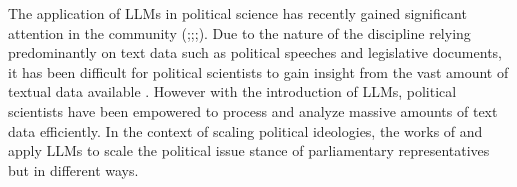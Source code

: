 \documentclass[final,5p,times,twocolumn,authoryear]{elsarticle}
\begin{document}
The application of LLMs in political science has recently gained significant attention in the community (\cite{LLMs-and-political-science};\cite{kato2024lupinllmbasedpoliticalideology};\cite{llm-latent-position-of-politicians};\cite{li2024politicalllmlargelanguagemodels}). Due to the nature of the discipline relying predominantly on text data such as political speeches and legislative documents, it has been difficult for political scientists to gain insight from the vast amount of textual data available \citep{li2024politicalllmlargelanguagemodels}. However with the introduction of LLMs, political scientists have been empowered to process and analyze massive amounts of text data efficiently. In the context of scaling political ideologies, the works of  \citeauthor{kato2024lupinllmbasedpoliticalideology} and \citeauthor{llm-latent-position-of-politicians} apply LLMs to scale the political issue stance of parliamentary representatives but in different ways. 
\end{document}
